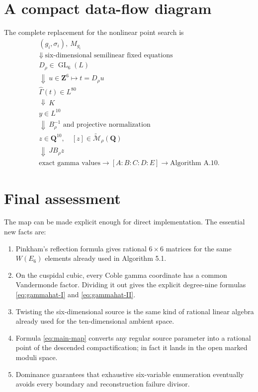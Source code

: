 \documentclass[11pt]{article}
\newcommand{\QQ}{\mathbf{Q}}
\newcommand{\ZZ}{\mathbf{Z}}
\newcommand{\tcM}{\widetilde{\mathcal{M}}}
\newcommand{\Gamhat}{\widehat{\Gamma}}
\begin{document}
\section{A compact data-flow diagram}

The complete replacement for the nonlinear point search is
\[
\boxed{
\begin{array}{c}
 (g_i,\sigma_i),\ M_{g_i}
 \\[-1mm]
 \Downarrow\ \text{six-dimensional semilinear fixed equations}
 \\[-1mm]
 D_\rho\in\operatorname{GL}_6(L)
 \\[-1mm]
 \Downarrow\ u\in\ZZ^6\mapsto t=D_\rho u
 \\[-1mm]
 \Gamhat(t)\in L^{80}
 \\[-1mm]
 \Downarrow\ K
 \\[-1mm]
 y\in L^{10}
 \\[-1mm]
 \Downarrow\ B_\rho^{-1}\text{ and projective normalization}
 \\[-1mm]
 z\in\QQ^{10},\quad [z]\in\tcM_\rho(\QQ)
 \\[-1mm]
 \Downarrow\ JB_\rho z
 \\[-1mm]
 \text{exact gamma values}\to[A:B:C:D:E]\to\text{Algorithm A.10}.
\end{array}}
\]

\section{Final assessment}

The map can be made explicit enough for direct implementation.  The essential new
facts are:

\begin{enumerate}
\item Pinkham's reflection formula gives rational $6\times6$ matrices for the same
$W(E_6)$ elements already used in Algorithm 5.1.
\item On the cuspidal cubic, every Coble gamma coordinate has a common Vandermonde
factor.  Dividing it out gives the explicit degree-nine formulas
\eqref{eq:gammahat-I} and \eqref{eq:gammahat-II}.
\item Twisting the six-dimensional source is the same kind of rational linear
algebra already used for the ten-dimensional ambient space.
\item Formula \eqref{eq:main-map} converts any regular source parameter into a
rational point of the descended compactification; in fact it lands in the open
marked moduli space.
\item Dominance guarantees that exhaustive six-variable enumeration eventually
avoids every boundary and reconstruction failure divisor.
\end{enumerate}
\end{document}
